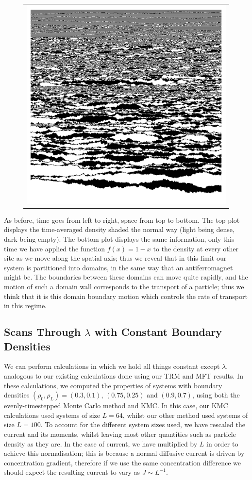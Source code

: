 \begin{figure}
\begin{center}
\begin{tabular}{c}
\includegraphics[width=0.8\linewidth]{numerics/images/stickyParticleFlows/aprilFlowDomains.png} \\
\end{tabular}
\end{center}
 \end{figure}
As before, time goes from left to right, space from top to bottom. 
The top plot displays the time-averaged density shaded the normal way (light being dense, dark being empty).
The bottom plot displays the same information, only this time we have applied the function $f(x) = 1-x$
to the density at every other site as we move along the spatial axis; thus we reveal that in this limit
our system is partitioned into domains, in the same way that an antiferromagnet might be. The boundaries
between these domains can move quite rapidly, and the motion of such a domain wall corresponds to the
transport of a particle; thus we think that it is this domain boundary motion which controls the rate
of transport in this regime.
 
 
\subsection{Scans Through $\lambda$ with Constant Boundary Densities} \label{sec:lambdaScans}
We can perform calculations in which we hold all things constant except $\lambda$, analogous to our 
existing calculations done using our TRM and MFT results. In these calculations, we computed the properties of systems with boundary densities $(\rho_0 , \rho_L )=(0.3, 0.1)$, $(0.75, 0.25)$ and 
$(0.9, 0.7)$, using both the evenly-timestepped Monte Carlo method and KMC. In this case, our KMC calculations used systems of size $L = 64$, whilst our other method used systems of size $L=100$.
To account for the different system sizes used, we have rescaled the current and its moments, whilst
leaving most other quantities such as particle density as they are. In the case of current, we have
multiplied by $L$ in order to achieve this normalisation; this is because a normal diffusive current is
driven by concentration gradient, therefore if we use the same concentration difference we should expect 
the resulting current to vary as $J \sim L^{-1}$.

